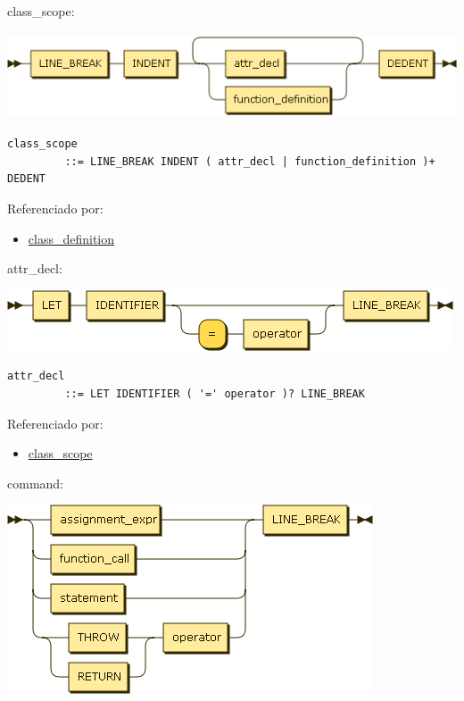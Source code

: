 \protect\hypertarget{class_scope}{}{class\_scope:}

\includegraphics[width=5.72917in,height=1.00000in]{diagram/class_scope.png}

\begin{verbatim}
class_scope
         ::= LINE_BREAK INDENT ( attr_decl | function_definition )+ DEDENT
\end{verbatim}

Referenciado por:

\begin{itemize}
\tightlist
\item
  \protect\hyperlink{class_definition}{class\_definition}
\end{itemize}

\protect\hypertarget{attr_decl}{}{attr\_decl:}

\includegraphics[width=5.20833in,height=0.70833in]{diagram/attr_decl.png}

\begin{verbatim}
attr_decl
         ::= LET IDENTIFIER ( '=' operator )? LINE_BREAK
\end{verbatim}

Referenciado por:

\begin{itemize}
\tightlist
\item
  \protect\hyperlink{class_scope}{class\_scope}
\end{itemize}

\protect\hypertarget{command}{}{command:}

\includegraphics[width=4.27083in,height=2.20833in]{diagram/command.png}

